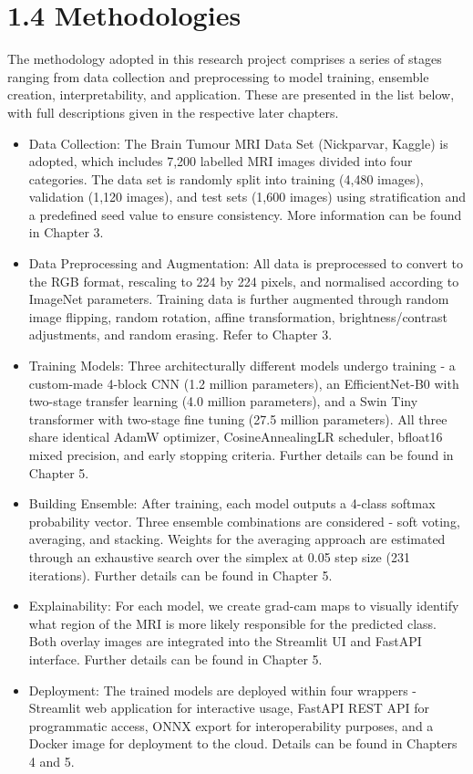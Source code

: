 \documentclass[12pt,a4paper,oneside]{report}
\begin{document}
\section*{1.4 Methodologies}
The methodology adopted in this research project comprises a series of stages ranging from data collection and preprocessing to model training, ensemble creation, interpretability, and application. These are presented in the list below, with full descriptions given in the respective later chapters.
\begin{itemize}[leftmargin=*]
  \item Data Collection: The Brain Tumour MRI Data Set (Nickparvar, Kaggle) is adopted, which includes 7,200 labelled MRI images divided into four categories. The data set is randomly split into training (4,480 images), validation (1,120 images), and test sets (1,600 images) using stratification and a predefined seed value to ensure consistency. More information can be found in Chapter 3.
  \item Data Preprocessing and Augmentation: All data is preprocessed to convert to the RGB format, rescaling to 224 by 224 pixels, and normalised according to ImageNet parameters. Training data is further augmented through random image flipping, random rotation, affine transformation, brightness/contrast adjustments, and random erasing. Refer to Chapter 3.
  \item Training Models: Three architecturally different models undergo training - a custom-made 4-block CNN (1.2 million parameters), an EfficientNet-B0 with two-stage transfer learning (4.0 million parameters), and a Swin Tiny transformer with two-stage fine tuning (27.5 million parameters). All three share identical AdamW optimizer, CosineAnnealingLR scheduler, bfloat16 mixed precision, and early stopping criteria. Further details can be found in Chapter 5.
  \item Building Ensemble: After training, each model outputs a 4-class softmax probability vector. Three ensemble combinations are considered - soft voting, averaging, and stacking. Weights for the averaging approach are estimated through an exhaustive search over the simplex at 0.05 step size (231 iterations). Further details can be found in Chapter 5.
  \item Explainability: For each model, we create grad-cam maps to visually identify what region of the MRI is more likely responsible for the predicted class. Both overlay images are integrated into the Streamlit UI and FastAPI interface. Further details can be found in Chapter 5.
  \item Deployment: The trained models are deployed within four wrappers - Streamlit web application for interactive usage, FastAPI REST API for programmatic access, ONNX export for interoperability purposes, and a Docker image for deployment to the cloud. Details can be found in Chapters 4 and 5.
\end{itemize}
\end{document}
